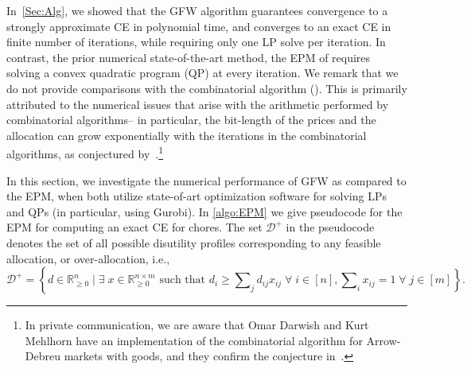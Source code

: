 \documentclass[format=acmsmall,authorversion]{acmart}
\newcommand{\notename}[2]{{\textcolor{blue}{\footnotesize{\bf (#1:} {#2}{\bf ) }}}}
\newcommand{\RM}[1]{{\notename{RM}{#1}}}
\begin{document}

In~\cref{Sec:Alg}, we showed that the GFW algorithm guarantees convergence to a strongly approximate CE in polynomial time, and converges to an exact CE in finite number of iterations, while requiring only one LP solve per iteration.
In contrast, the prior numerical state-of-the-art method, the EPM of \citet{boodaghians2022polynomial} requires solving a convex quadratic program (QP) at every iteration. We remark that we do not provide comparisons with the combinatorial algorithm (\cite{ChaudhuryGMM22}). This is primarily attributed to the numerical issues that arise with the arithmetic performed by combinatorial algorithms-- in particular, the bit-length of the prices and the allocation can grow exponentially with the iterations in the combinatorial algorithms, as conjectured by~\cite{DuanM15}.\footnote{In private communication, we are aware that Omar Darwish and Kurt Mehlhorn have an implementation of the combinatorial algorithm for Arrow-Debreu markets with goods, and they confirm the conjecture in~\cite{DuanM15}.}

In this section, we investigate the numerical performance of GFW as compared to the EPM, when both utilize state-of-art optimization software for solving LPs and QPs (in particular, using Gurobi).
In \cref{algo:EPM} we give pseudocode for the EPM for computing an exact CE for chores. 
The set $\mathcal{D}^+$ in the pseudocode denotes the set of all possible disutility profiles corresponding to any feasible allocation, or over-allocation, i.e., \begin{equation*}
    \mathcal{D}^+ = \left\{ d \in \mathbb{R}^n_{\geq 0} \;\vert\; \exists\; x \in \mathbb{R}^{n \times m}_{\geq 0} \mbox{ such that } d_i \geq \sum\nolimits_j d_{ij} x_{ij} \;\forall\; i \in [n], \sum\nolimits_i x_{ij} = 1 \;\forall\; j \in [m] \right\}. 
\end{equation*}
\begin{algorithm}[t]
    \SetAlgoNoEnd
    \SetAlgoNoLine
    \caption{Exterior Point Method (EPM)}
    \label{algo:EPM}
\end{algorithm}
\end{document}
